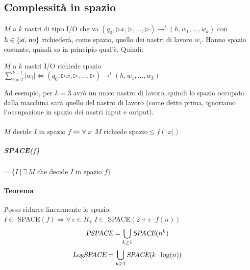 \documentclass[10pt]{book}
\begin{document}
\subsection{Complessità in spazio}
\paragraph{} $M$ a $k$ nastri di tipo I/O che va $(q_0, \triangleright x, \triangleright, \ldots, \triangleright) \rightarrow^t (h, w_1, \ldots, w_k)$ con $h \in \{\textsl{si, no}\}$ richiederà, come spazio, quello dei nastri di lavoro $w_i$. Hanno spazio costante, quindi so in principio qual'è. Quindi:
\begin{list}{}{}
	\item $M$ a $k$ nastri I/O richiede spazio $\sum_{i=2}^{k-1} |w_i| \Leftrightarrow (q_0, \triangleright x, \triangleright, \ldots, \triangleright) \rightarrow^t (h, w_1, \ldots, w_k)$
\end{list}
Ad esempio, per $k = 3$ avrò un unico nastro di lavoro, quindi lo spazio occupato dalla macchina sarà quello del nastro di lavoro (come detto prima, ignoriamo l'occupazione in spazio dei nastri input e output).
\pagebreak
\paragraph{} $M$ decide $I$ in spazio $f \Leftrightarrow \forall\: x\:\:M$ richiede spazio$\leq f(|x|)$
\subparagraph{SPACE($f$)} = $\{I\: |\:\exists\: M$ che decide $I$ in spazio $f\}$
\paragraph{Teorema} Posso ridurre linearmente lo spazio.\\
$I \in$ SPACE$(f) \Rightarrow \forall\:\epsilon\in R_+\: I \in$ SPACE$(2 + \epsilon\cdot f(n))$
$$\textsl{PSPACE} = \bigcup_{k\geq 1} \textsl{SPACE}(n^k)$$
$$\textsl{LogSPACE} = \bigcup_{k\geq 1} \textsl{SPACE}(k\cdot\log(n))$$
\end{document}
